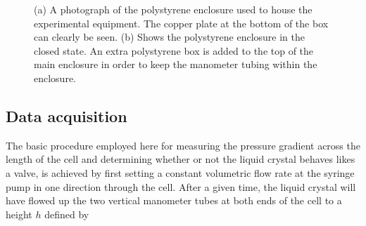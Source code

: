 \begin{figure}
\begin{center}
\end{center}
\caption[Pictures of polystyrene housing for isotropic phase experiments]{\label{fig:heat_box_photos}(a) A photograph of the polystyrene enclosure used to house the experimental equipment. The copper plate at the bottom of the box can clearly be seen. (b) Shows the polystyrene enclosure in the closed state. An extra polystyrene box is added to the top of the main enclosure in order to keep the manometer tubing within the enclosure.}
\end{figure}

\subsection{Data acquisition}
The basic procedure employed here for measuring the pressure gradient across the length of the cell and determining whether or not the liquid crystal behaves likes a valve, is achieved by first setting a constant volumetric flow rate at the syringe pump in one direction through the cell. After a given time, the liquid crystal will have flowed up the two vertical manometer tubes at both ends of the cell to a height $h$ defined by

